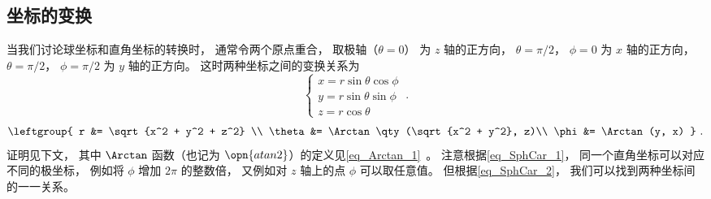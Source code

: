 

\subsection{坐标的变换}
当我们讨论球坐标和直角坐标的转换时， 通常令两个原点重合， 取极轴（$\theta = 0$） 为 $z$ 轴的正方向， $\theta = \pi/2$， $\phi = 0$ 为 $x$ 轴的正方向， $\theta = \pi/2$， $\phi = \pi/2$ 为 $y$ 轴的正方向。 这时两种坐标之间的变换关系为
\begin{equation}\label{eq_SphCar_1}
\begin{cases}
x = r\sin \theta \cos \phi \\
y = r\sin \theta \sin \phi \\
z = r\cos \theta 
\end{cases}~.
\end{equation}
\begin{equation}\label{eq_SphCar_2}
\leftgroup{
r &= \sqrt {x^2 + y^2 + z^2} \\
\theta  &= \Arctan\qty(\sqrt{x^2 + y^2}, z)\\
\phi  &= \Arctan(y, x)
}~.\end{equation}
证明见下文， 其中 $\Arctan$ 函数（也记为 $\opn{atan2}$）的定义见\autoref{eq_Arctan_1}~。 注意根据\autoref{eq_SphCar_1}， 同一个直角坐标可以对应不同的极坐标， 例如将 $\phi$ 增加 $2\pi$ 的整数倍， 又例如对 $z$ 轴上的点 $\phi$ 可以取任意值。 但根据\autoref{eq_SphCar_2}， 我们可以找到两种坐标间的一一关系。


